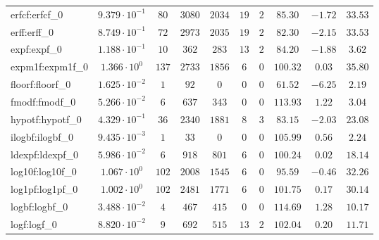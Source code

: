 \begin{tabular}{|l|c|c|c|c|c|c|c|c|c|}
erfcf:erfcf\_0               & $ 9.379 \cdot 10^{-1} $ & $ 80     $ & $ 3080  $ & $ 2034  $ & $ 19  $ & $ 2  $ & $ 85.30       $ & $ -1.72   $ & $ 33.53   $ \\
erff:erff\_0                 & $ 8.749 \cdot 10^{-1} $ & $ 72     $ & $ 2973  $ & $ 2035  $ & $ 19  $ & $ 2  $ & $ 82.30       $ & $ -2.15   $ & $ 33.53   $ \\
expf:expf\_0                 & $ 1.188 \cdot 10^{-1} $ & $ 10     $ & $ 362   $ & $ 283   $ & $ 13  $ & $ 2  $ & $ 84.20       $ & $ -1.88   $ & $ 3.62    $ \\
expm1f:expm1f\_0             & $ 1.366 \cdot 10^{0}  $ & $ 137    $ & $ 2733  $ & $ 1856  $ & $ 6   $ & $ 0  $ & $ 100.32      $ & $ 0.03    $ & $ 35.80   $ \\
floorf:floorf\_0             & $ 1.625 \cdot 10^{-2} $ & $ 1      $ & $ 92    $ & $ 0     $ & $ 0   $ & $ 0  $ & $ 61.52       $ & $ -6.25   $ & $ 2.19    $ \\
fmodf:fmodf\_0               & $ 5.266 \cdot 10^{-2} $ & $ 6      $ & $ 637   $ & $ 343   $ & $ 0   $ & $ 0  $ & $ 113.93      $ & $ 1.22    $ & $ 3.04    $ \\
hypotf:hypotf\_0             & $ 4.329 \cdot 10^{-1} $ & $ 36     $ & $ 2340  $ & $ 1881  $ & $ 8   $ & $ 3  $ & $ 83.15       $ & $ -2.03   $ & $ 23.08   $ \\
ilogbf:ilogbf\_0             & $ 9.435 \cdot 10^{-3} $ & $ 1      $ & $ 33    $ & $ 0     $ & $ 0   $ & $ 0  $ & $ 105.99      $ & $ 0.56    $ & $ 2.24    $ \\
ldexpf:ldexpf\_0             & $ 5.986 \cdot 10^{-2} $ & $ 6      $ & $ 918   $ & $ 801   $ & $ 6   $ & $ 0  $ & $ 100.24      $ & $ 0.02    $ & $ 18.14   $ \\
log10f:log10f\_0             & $ 1.067 \cdot 10^{0}  $ & $ 102    $ & $ 2008  $ & $ 1545  $ & $ 6   $ & $ 0  $ & $ 95.59       $ & $ -0.46   $ & $ 32.26   $ \\
log1pf:log1pf\_0             & $ 1.002 \cdot 10^{0}  $ & $ 102    $ & $ 2481  $ & $ 1771  $ & $ 6   $ & $ 0  $ & $ 101.75      $ & $ 0.17    $ & $ 30.14   $ \\
logbf:logbf\_0               & $ 3.488 \cdot 10^{-2} $ & $ 4      $ & $ 467   $ & $ 415   $ & $ 0   $ & $ 0  $ & $ 114.69      $ & $ 1.28    $ & $ 10.17   $ \\
logf:logf\_0                 & $ 8.820 \cdot 10^{-2} $ & $ 9      $ & $ 692   $ & $ 515   $ & $ 13  $ & $ 2  $ & $ 102.04      $ & $ 0.20    $ & $ 11.71   $ \\

\end{tabular}
